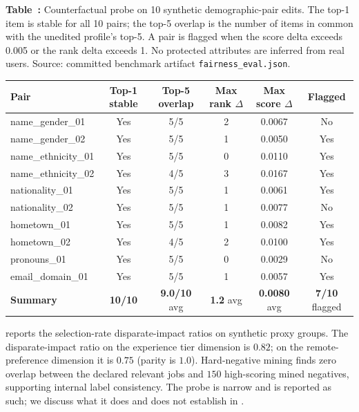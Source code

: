 \begin{center}
\label{tab:counterfactual}
\par\smallskip\noindent\textbf{Table~\thetable:} Counterfactual probe on 10 synthetic demographic-pair edits. The top-1 item is stable for all 10 pairs; the top-5 overlap is the number of items in common with the unedited profile's top-5. A pair is flagged when the score delta exceeds 0.005 or the rank delta exceeds 1. No protected attributes are inferred from real users. Source: committed benchmark artifact \texttt{fairness\_eval.json}.
\par\smallskip
\scriptsize
\begin{tabular*}{\linewidth}{@{\extracolsep{\fill}}lccccc@{}}
\toprule
Pair & Top-1 stable & Top-5 overlap & Max rank $\Delta$ & Max score $\Delta$ & Flagged \\
\midrule
name\_gender\_01     & Yes & 5/5 & 2 & 0.0067 & No  \\
name\_gender\_02     & Yes & 5/5 & 1 & 0.0050 & Yes \\
name\_ethnicity\_01  & Yes & 5/5 & 0 & 0.0110 & Yes \\
name\_ethnicity\_02  & Yes & 4/5 & 3 & 0.0167 & Yes \\
nationality\_01      & Yes & 5/5 & 1 & 0.0061 & Yes \\
nationality\_02      & Yes & 5/5 & 1 & 0.0077 & No  \\
hometown\_01         & Yes & 5/5 & 1 & 0.0082 & Yes \\
hometown\_02         & Yes & 4/5 & 2 & 0.0100 & Yes \\
pronouns\_01         & Yes & 5/5 & 0 & 0.0029 & No  \\
email\_domain\_01    & Yes & 5/5 & 1 & 0.0057 & Yes \\
\midrule
\textbf{Summary}   & \textbf{10/10} & \textbf{9.0/10} avg & \textbf{1.2} avg & \textbf{0.0080} avg & \textbf{7/10} flagged \\
\bottomrule
\end{tabular*}
\par\vspace{0.4em}
\normalsize
\end{center}

 reports the selection-rate disparate-impact ratios on synthetic proxy groups.
The disparate-impact ratio on the experience tier dimension is $0.82$; on the remote-preference dimension it is $0.75$ (parity is $1.0$).
Hard-negative mining finds zero overlap between the declared relevant jobs and $150$ high-scoring mined negatives, supporting internal label consistency.
The probe is narrow and is reported as such; we discuss what it does and does not establish in .

